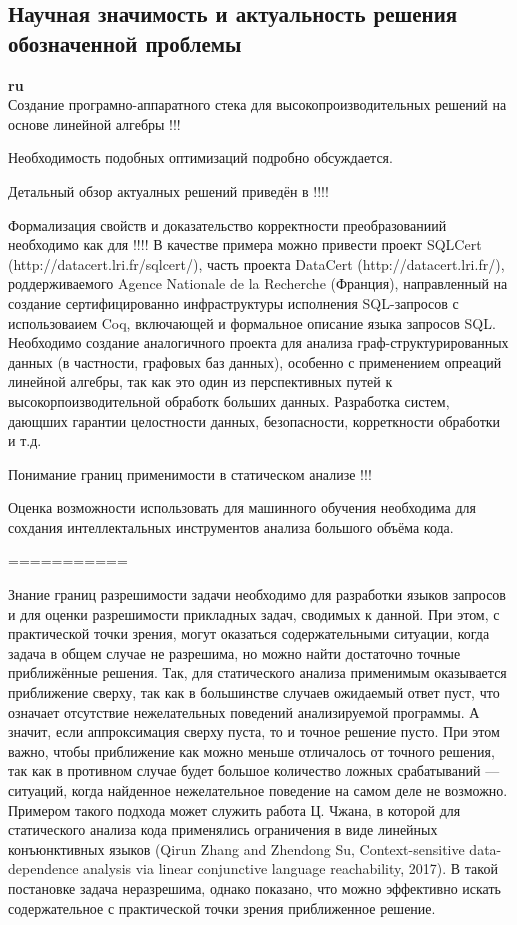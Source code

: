 \documentclass[12pt]{article}  %
\theoremstyle{remark}
\begin{document}
\subsection{Научная значимость и актуальность решения обозначенной проблемы}

\textbf{ru}\\

Создание програмно-аппаратного стека для высокопроизводительных решений на основе линейной алгебры !!!

Необходимость подобных оптимизаций подробно обсуждается.

Детальный обзор актуалных решений приведён в !!!!

Формализация свойств и доказательство корректности преобразованиий необходимо как для !!!!
В качестве примера можно привести проект SQLCert (http://datacert.lri.fr/sqlcert/), часть проекта DataCert (http://datacert.lri.fr/), роддерживаемого Agence Nationale de la Recherche (Франция), направленный на создание сертифицированно инфраструктуры исполнения SQL-запросов с использоваием Coq, включающей и формальное описание языка запросов SQL. Необходимо создание аналогичного проекта для анализа граф-структурированных данных (в частности, графовых баз данных), особенно с применением опреаций линейной алгебры, так как это один из перспективных путей к высокорпоизводительной обработк больших данных.
Разработка систем, дающших гарантии целостности данных, безопасности, корреткности обработки и т.д.

Понимание границ применимости в статическом анализе !!!

Оценка возможности использовать для машинного обучения необходима для сохдания интеллектальных инструментов анализа большого объёма кода.


===========



Знание границ разрешимости задачи необходимо для разработки языков запросов и для оценки разрешимости прикладных задач, сводимых к данной. При этом, с практической точки зрения, могут оказаться содержательными ситуации, когда задача в общем случае не разрешима, но можно найти достаточно точные приближённые решения. Так, для статического анализа применимым  оказывается приближение сверху, так как в большинстве случаев ожидаемый ответ пуст, что означает отсутствие нежелательных поведений анализируемой программы. А значит, если аппроксимация сверху пуста, то и точное решение пусто. При этом важно, чтобы приближение как можно меньше отличалось от точного решения, так как в противном случае будет большое количество ложных срабатываний — ситуаций, когда найденное нежелательное поведение на самом деле не возможно. Примером такого подхода может служить работа Ц. Чжана, в которой для статического анализа кода применялись ограничения в виде линейных конъюнктивных языков (Qirun Zhang and Zhendong Su, Context-sensitive data-dependence analysis via linear conjunctive language reachability, 2017). В такой постановке задача неразрешима, однако показано, что можно эффективно искать содержательное с практической точки зрения приближенное решение.
\end{document}

